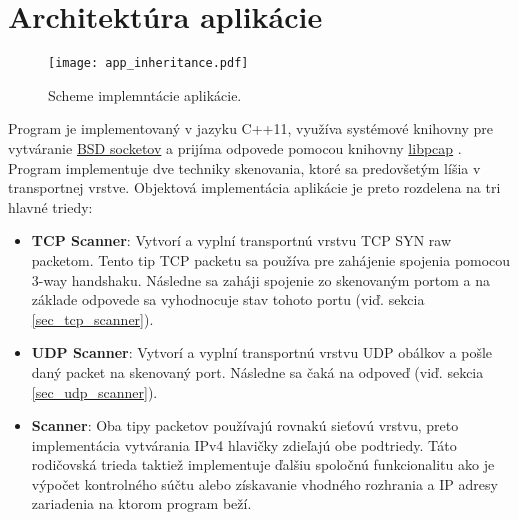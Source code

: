 \documentclass[a4paper, 11pt]{article}
\begin{document}
\section{Architektúra aplikácie}
\begin{wrapfigure}{r}{0.3\textwidth}
	\centering
	\texttt{[image: app\_inheritance.pdf]}
	\caption{Scheme implemntácie aplikácie.}
	\label{obr1}
\end{wrapfigure} 
 Program je implementovaný v jazyku C++11, využíva systémové knihovny pre vytváranie  \href{http://pubs.opengroup.org/onlinepubs/007908775/xns/syssocket.h.html}{BSD socketov} a prijíma odpovede pomocou knihovny \href{https://www.tcpdump.org/}{libpcap} . Program implementuje dve techniky skenovania, ktoré sa predovšetým líšia v transportnej vrstve. Objektová implementácia aplikácie je preto rozdelena na tri hlavné triedy:
 \begin{itemize}
 	\item \textbf{TCP Scanner}: Vytvorí a vyplní transportnú vrstvu TCP SYN raw packetom. Tento tip TCP packetu sa používa pre zahájenie spojenia pomocou 3-way handshaku. %
 	 Následne sa zaháji spojenie zo skenovaným portom a na základe odpovede sa vyhodnocuje stav tohoto portu (viď. sekcia \ref{sec_tcp_scanner}).
 	\item \textbf{UDP Scanner}: Vytvorí a vyplní transportnú vrstvu UDP obálkov a pošle daný packet na skenovaný port. Následne sa čaká na odpoveď (viď. sekcia \ref{sec_udp_scanner}).
 	\item \textbf{Scanner}: Oba tipy packetov používajú rovnakú sieťovú vrstvu, preto implementácia vytvárania IPv4 hlavičky zdieľajú obe podtriedy. Táto rodičovská trieda taktiež implementuje ďalšiu spoločnú funkcionalitu ako je výpočet kontrolného súčtu alebo získavanie vhodného rozhrania a IP adresy zariadenia na ktorom program beží.
 \end{itemize}
\end{document}
